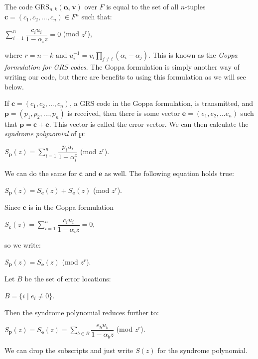 \documentclass{article}
\begin{document}
The code $\text{GRS}_{n,k}(\boldsymbol\alpha, \textbf{v})$ over $F$ is equal to the set of all $n$-tuples $\textbf{c} = (c_{1},c_{2},...,c_{n}) \in F^{n}$ such that:
\begin{center}
$\sum\limits_{i = 1}^{n} \dfrac{c_{i}u_{i}}{1 - \alpha_{i}z} = 0$ (mod $z^{r}$),
\end{center}
where $r = n - k \text{ and } u_{i}^{-1} = v_{i}\prod\limits_{j \neq i} (\alpha_{i} - \alpha_{j})$. This is known as the \textit{Goppa formulation for GRS codes}. The Goppa formulation is simply another way of writing our code, but there are benefits to using this formulation as we will see below.

If $\textbf{c} = (c_{1},c_{2},...,c_{n})$, a GRS code in the Goppa formulation, is transmitted, and $\textbf{p} = (p_{1},p_{2},...,p_{n})$ is received, then there is some vector $\textbf{e} = (e_{1},e_{2},...e_{n})$ such that $\textbf{p} = \textbf{c} + \textbf{e}$. This vector is called the error vector. We can then calculate the \textit{syndrome polynomial} of \textbf{p}:
\begin{center}
$S_{\textbf{p}}(z) = \sum\limits_{i=1}^{n} \dfrac{p_{i}u_{i}}{1 - \alpha_{i}^{z}}$ (mod $z^{r}$).
\end{center}
We can do the same for $\textbf{c}$ and $\textbf{e}$ as well. The following equation holds true:
\begin{center}
$S_{\textbf{p}}(z) = S_{\textbf{c}}(z) + S_{\textbf{e}}(z)$ (mod $z^{r}$).
\end{center}
Since $\textbf{c}$ is in the Goppa formulation
\begin{center}
$S_{\textbf{c}}(z) = \sum\limits_{i = 1}^{n} \dfrac{c_{i}u_{i}}{1 - \alpha_{i}z} = 0$,
\end{center}
so we write:
\begin{center}
$S_{\textbf{p}}(z) = S_{\textbf{e}}(z)$ (mod $z^{r}$).
\end{center}
Let $B$ be the set of error locations:
\begin{center}
$B =  \{i \mid e_{i} \neq 0\}$.
\end{center}
Then the syndrome polynomial reduces further to:
\begin{center}
$S_{\textbf{p}}(z) = S_{\textbf{e}}(z) = \sum\limits_{b \in B} \dfrac{e_{b}u_{b}}{1 - \alpha_{b}z} $ (mod $z^{r}$).
\end{center}
We can drop the subscripts and just write $S(z)$ for the syndrome polynomial.
\end{document}
